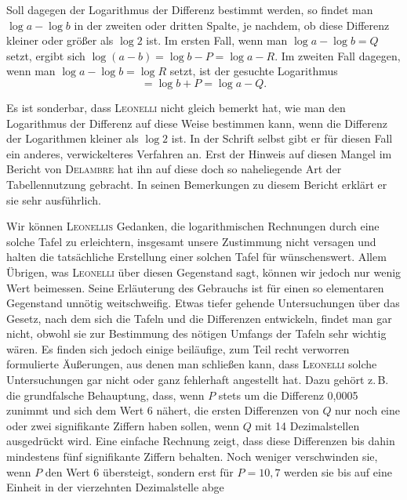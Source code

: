 Soll dagegen der Logarithmus der Differenz bestimmt werden, so findet man $\log a - \log b$ in der zweiten oder dritten Spalte, je nachdem, ob diese Differenz kleiner oder größer als $\log 2$ ist. Im ersten Fall, wenn man $\log a - \log b = Q$ setzt, ergibt sich $\log(a-b) = \log b - P = \log a - R$. Im zweiten Fall dagegen, wenn man $\log a - \log b = \log R$ setzt, ist der gesuchte Logarithmus
\[
= \log b + P = \log a - Q.
\]

Es ist sonderbar, dass \textsc{Leonelli} nicht gleich bemerkt hat, wie man den Logarithmus der Differenz auf diese Weise bestimmen kann, wenn die Differenz der Logarithmen kleiner als $\log 2$ ist. In der Schrift selbst gibt er für diesen Fall ein anderes, verwickelteres Verfahren an. Erst der Hinweis auf diesen Mangel im Bericht von \textsc{Delambre} hat ihn auf diese doch so naheliegende Art der Tabellennutzung gebracht. In seinen Bemerkungen zu diesem Bericht erklärt er sie sehr ausführlich.

Wir können \textsc{Leonellis} Gedanken, die logarithmischen Rechnungen durch eine solche Tafel zu erleichtern, insgesamt unsere Zustimmung nicht versagen und halten die tatsächliche Erstellung einer solchen Tafel für wünschenswert. Allem Übrigen, was \textsc{Leonelli} über diesen Gegenstand sagt, können wir jedoch nur wenig Wert beimessen. Seine Erläuterung des Gebrauchs ist für einen so elementaren Gegenstand unnötig weitschweifig. Etwas tiefer gehende Untersuchungen über das Gesetz, nach dem sich die Tafeln und die Differenzen entwickeln, findet man gar nicht, obwohl sie zur Bestimmung des nötigen Umfangs der Tafeln sehr wichtig wären. Es finden sich jedoch einige beiläufige, zum Teil recht verworren formulierte Äußerungen, aus denen man schließen kann, dass \textsc{Leonelli} solche Untersuchungen gar nicht oder ganz fehlerhaft angestellt hat. Dazu gehört z.\,B. die grundfalsche Behauptung, dass, wenn $P$ stets um die Differenz 0,0005 zunimmt und sich dem Wert 6 nähert, die ersten Differenzen von $Q$ nur noch eine oder zwei signifikante Ziffern haben sollen, wenn $Q$ mit 14 Dezimalstellen ausgedrückt wird. Eine einfache Rechnung zeigt, dass diese Differenzen bis dahin mindestens fünf signifikante Ziffern behalten. Noch weniger verschwinden sie, wenn $P$ den Wert 6 übersteigt, sondern erst für $P = 10,7$ werden sie bis auf eine Einheit in der vierzehnten Dezimalstelle abge%
